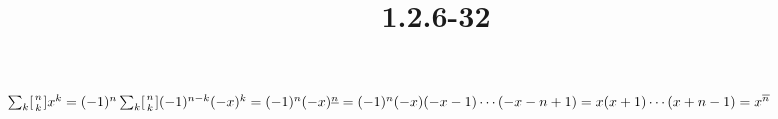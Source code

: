 \documentclass{article}
\title{1.2.6-32}
\begin{document}
\maketitle

\( \sum_k [{n \atop k}]x^k = (-1)^n\sum_k [{n \atop k}](-1)^{n-k}(-x)^k = (-1)^n(-x)^{\underline{n}} = (-1)^n(-x)(-x-1)\cdots(-x-n+1) = x(x+1)\cdots(x+n-1) = x^{\overline{n}} \)
\end{document}
